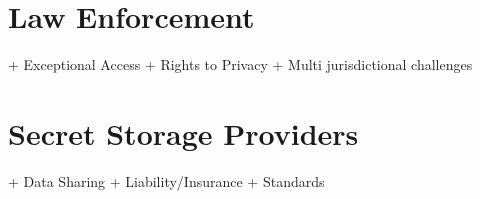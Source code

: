 
\section{Law Enforcement}
\label{chap:policy:leo}

+ Exceptional Access
+ Rights to Privacy
+ Multi jurisdictional challenges

\section{Secret Storage Providers}
\label{chap:policy:ssp}

+ Data Sharing
+ Liability/Insurance
+ Standards

